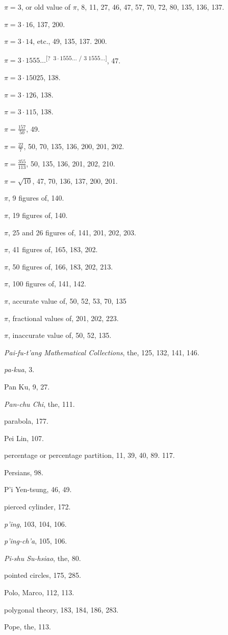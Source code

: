 \documentclass[11pt]{article}
\newcommand{\unclear}[1]{\textsuperscript{[?~#1]}}
\begin{document}
$\pi = 3$, or old value of $\pi$, 8, 11, 27, 46, 47, 57, 70, 72, 80, 135, 136, 137.\par
$\pi = 3\cdot 16$, 137, 200.\par
$\pi = 3\cdot 14$, etc., 49, 135, 137. 200.\par
$\pi = 3\cdot 1555\ldots$\unclear{$3\cdot 1555\ldots$ / $3\;1555\ldots$}, 47.\par
$\pi = 3\cdot 15025$, 138.\par
$\pi = 3\cdot 126$, 138.\par
$\pi = 3\cdot 115$, 138.\par
$\pi = \frac{157}{50}$, 49.\par
$\pi = \frac{22}{7}$, 50, 70, 135, 136, 200, 201, 202.\par
$\pi = \frac{355}{113}$, 50, 135, 136, 201, 202, 210.\par
$\pi = \sqrt{10}$, 47, 70, 136, 137, 200, 201.\par
$\pi$, 9 figures of, 140.\par
$\pi$, 19 figures of, 140.\par
$\pi$, 25 and 26 figures of, 141, 201, 202, 203.\par
$\pi$, 41 figures of, 165, 183, 202.\par
$\pi$, 50 figures of, 166, 183, 202, 213.\par
$\pi$, 100 figures of, 141, 142.\par
$\pi$, accurate value of, 50, 52, 53, 70, 135\par
$\pi$, fractional values of, 201, 202, 223.\par
$\pi$, inaccurate value of, 50, 52, 135.\par
\emph{Pai-fu-t'ang Mathematical Collections}, the, 125, 132, 141, 146.\par
\emph{pa-kua}, 3.\par
Pan Ku, 9, 27.\par
\emph{Pan-chu Chi}, the, 111.\par
parabola, 177.\par
Pei Lin, 107.\par
percentage or percentage partition, 11, 39, 40, 89. 117.\par
Persians, 98.\par
P'i Yen-tsung, 46, 49.\par
pierced cylinder, 172.\par
\emph{p'ing}, 103, 104, 106.\par
\emph{p'ing-ch'a}, 105, 106.\par
\emph{Pi-shu Su-hsiao}, the, 80.\par
pointed circles, 175, 285.\par
Polo, Marco, 112, 113.\par
polygonal theory, 183, 184, 186, 283.\par
Pope, the, 113.\par
\end{document}
